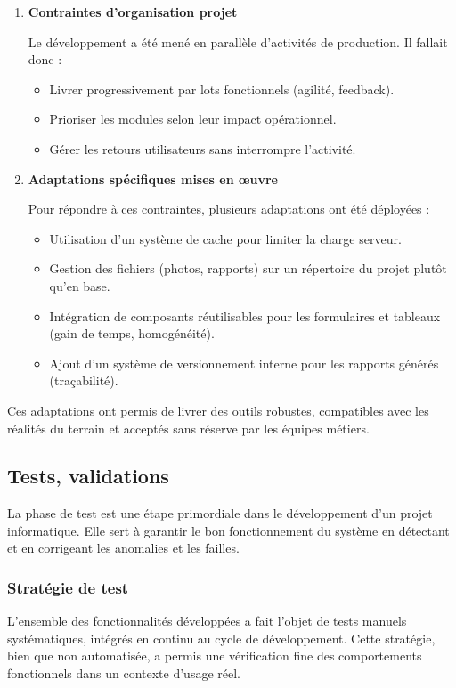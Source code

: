 \documentclass[11pt,a4paper]{article}
\begin{document}
\begin{enumerate}
\item \textbf{Contraintes d’organisation projet}


Le développement a été mené en parallèle d’activités de production. Il fallait donc :
\begin{itemize}
    \item Livrer progressivement par lots fonctionnels (agilité, feedback).
    \item Prioriser les modules selon leur impact opérationnel.
    \item Gérer les retours utilisateurs sans interrompre l’activité.
\end{itemize}

\item \textbf{Adaptations spécifiques mises en œuvre} 


Pour répondre à ces contraintes, plusieurs adaptations ont été déployées :
\begin{itemize}
    \item Utilisation d’un système de cache pour limiter la charge serveur.
    \item Gestion des fichiers (photos, rapports) sur un répertoire du projet plutôt qu’en base.
    \item Intégration de composants réutilisables pour les formulaires et tableaux (gain de temps, homogénéité).
    \item Ajout d’un système de versionnement interne pour les rapports générés (traçabilité).
\end{itemize}
\end{enumerate}
Ces adaptations ont permis de livrer des outils robustes, compatibles avec les réalités du terrain et acceptés sans réserve par les équipes métiers.


\subsection{Tests, validations}

La phase de test est une étape primordiale dans le développement d’un projet informatique. Elle sert à garantir le bon fonctionnement du système en détectant et en corrigeant les anomalies et les failles.

\subsubsection{Stratégie de test}

L’ensemble des fonctionnalités développées a fait l’objet de tests manuels systématiques, intégrés en continu au cycle de développement. Cette stratégie, bien que non automatisée, a permis une vérification fine des comportements fonctionnels dans un contexte d’usage réel.
\end{document}
